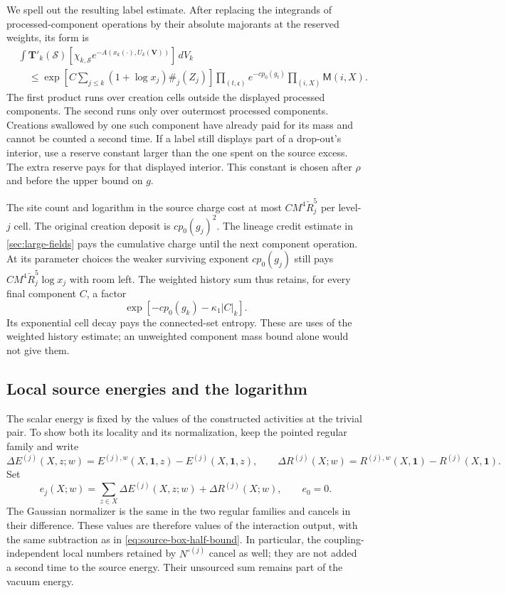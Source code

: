 \documentclass[11pt,letterpaper,reqno]{amsart}
\theoremstyle{definition}
\theoremstyle{remark}
\begin{document}
We spell out the resulting label estimate. After replacing the
integrands of processed-component operations by their absolute
majorants at the reserved weights, its form is
\begin{align*}
 &\int\mathbf T'_k(\mathcal S)
       [\chi_{k,\mathcal S}e^{-A(x_k(\cdot),U_k(\mathbf V))}]\,dV_k\\
 &\quad\le
   \exp\left[C\sum_{j\le k}(1+\log x_j)\#_j(Z_j)\right]
      \prod_{(t,\mathfrak c)}e^{-cp_0(g_t)}
      \prod_{(i,X)}\mathsf M(i,X).
\end{align*}
The first product runs over creation cells outside the displayed
processed components. The second runs only over outermost processed
components. Creations swallowed by one such component have already
paid for its mass and cannot be counted a second time. If a label
still displays part of a drop-out's interior, use a reserve constant
larger than the one spent on the source excess. The extra reserve pays
for that displayed interior. This constant is chosen after $\rho$ and
before the upper bound on $g$.

The site count and logarithm in the source charge cost at most
$CM^4\check R_j^5$ per level-$j$ cell. The original creation deposit
is $cp_0(g_j)^2$. The lineage credit estimate in
\cref{sec:large-fields} pays the cumulative charge until the next
component operation. At its parameter choices the weaker surviving
exponent $cp_0(g_j)$ still pays
$CM^4\check R_j^5\log x_j$ with room left. The weighted history
sum thus retains, for every final component $C$, a factor
\[
 \exp[-cp_0(g_k)-\kappa_1|C|_k].
\]
Its exponential cell decay pays the connected-set entropy. These are
uses of the weighted history estimate; an unweighted component mass
bound alone would not give them.

\subsection{Local source energies and the logarithm}
\label{sec:source-energies}

The scalar energy is fixed by the values of the constructed
activities at the trivial pair. To show both its locality and its
normalization, keep the pointed regular family and write
\[
 \Delta E^{(j)}(X,z;w)
    =E^{(j),w}(X,\mathbf1,z)-E^{(j)}(X,\mathbf1,z),\qquad
 \Delta R^{(j)}(X;w)
    =R^{(j),w}(X,\mathbf1)-R^{(j)}(X,\mathbf1).
\]
Set
\begin{equation}\label{eq:source-energy-local-definition}
 e_j(X;w)=\sum_{z\in X}\Delta E^{(j)}(X,z;w)
                         +\Delta R^{(j)}(X;w),\qquad e_0=0.
\end{equation}
The Gaussian normalizer is the same in the two regular families
and cancels in their difference. These values are therefore values
of the interaction output, with the same subtraction as in
\eqref{eq:source-box-half-bound}. In particular, the
coupling-independent local numbers retained by $N^{\circ(j)}$
cancel as well; they are not added a second time to the source
energy. Their unsourced sum remains part of the vacuum energy.
\end{document}
